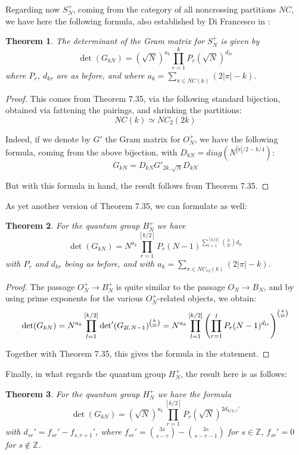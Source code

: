 \documentclass[12pt]{amsbook}
\newtheorem{theorem}{Theorem}[chapter]
\begin{document}
Regarding now $S_N^+$, coming from the category of all noncrossing partitions $NC$, we have here the following formula, also established by Di Francesco in \cite{dif}:


\begin{theorem}
The determinant of the Gram matrix for $S_N^+$ is given by
$$\det(G_{kN})=(\sqrt{N})^{a_k}\prod_{r=1}^kP_r(\sqrt{N})^{d_{kr}}$$
where $P_r$, $d_{kr}$ are as before, and where $a_k=\sum_{\pi\in NC(k)}(2|\pi|-k)$.
\end{theorem}

\begin{proof}
This comes from Theorem 7.35, via the following standard bijection, obtained via fattening the pairings, and shrinking the partitions:
$$NC(k)\simeq NC_2(2k)$$

Indeed, if we denote by $G'$ the Gram matrix for $O_N^+$, we have the following formula, coming from the above bijection, with $D_{kN}=diag(N^{|\widetilde\pi|/2-k/4})$:
$$G_{kN}=D_{kN}G'_{2k,\sqrt{N}}D_{kN}$$

But with this formula in hand, the result follows from Theorem 7.35.
\end{proof}

As yet another version of Theorem 7.35, we can formulate as well:

\begin{theorem}
For the quantum group $B_N^+$ we have
$$\det(G_{kN})=N^{a_k}\prod_{r=1}^{[k/2]}P_r(N-1)^{\sum_{l=1}^{[k/2]}\binom{k}{2l}d_{lr}}$$
with $P_r$ and $d_{kr}$ being as before, and with $a_k=\sum_{\pi\in NC_{12}(k)}(2|\pi|-k)$.
\end{theorem}

\begin{proof}
The passage $O_N^+\to B_N^+$ is quite similar to the passage $O_N\to B_N$, and by using prime exponents for the various $O_N^+$-related objects, we obtain:
$$\det(G_{kN})
=N^{a_k}\prod_{l=1}^{[k/2]}{\rm det}'(G_{2l,N-1})^{\binom{k}{2l}}
=N^{a_k}\prod_{l=1}^{[k/2]}\left(\prod_{r=1}^lP_r(N-1)^{d_{lr}}\right)^{\binom{k}{2l}}$$

Together with Theorem 7.35, this gives the formula in the statement.
\end{proof}

Finally, in what regards the quantum group $H_N^+$, the result here is as follows:

\begin{theorem}
For the quantum group $H_N^+$ we have the formula
$$\det(G_{kN})=(\sqrt{N})^{a_k}\prod_{r=1}^{[k/2]}P_r(\sqrt{N})^{2d_{k/2,r}'}$$
with $d_{sr}'=f_{sr}'-f_{s,r+1}'$, where 
$f_{sr}'=\binom{3s}{s-r}-\binom{3s}{s-r-1}$ for $s\in\mathbb Z$, $f_{sr}'=0$ for $s\notin\mathbb Z$.
\end{theorem}
\end{document}
